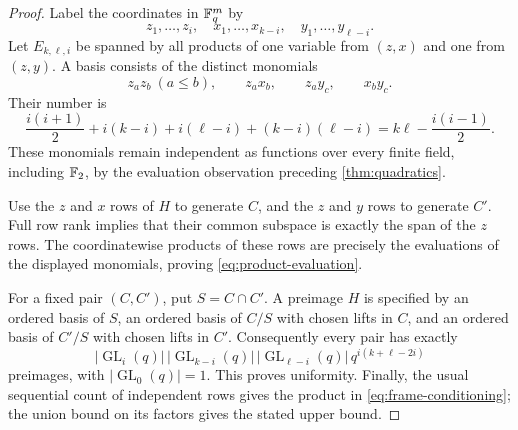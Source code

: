 \begin{proof}
Label the coordinates in $\mathbb F_q^m$ by
\[
 z_1,\ldots,z_i,\quad x_1,\ldots,x_{k-i},\quad
 y_1,\ldots,y_{\ell-i}.
\]
Let $E_{k,\ell,i}$ be spanned by all products of one variable from
$(z,x)$ and one from $(z,y)$.  A basis consists of the distinct monomials
\[
 z_a z_b\ (a\le b),\qquad z_a x_b,\qquad z_a y_c,\qquad x_b y_c.
\]
Their number is
\[
 \frac{i(i+1)}2+i(k-i)+i(\ell-i)+(k-i)(\ell-i)
 =k\ell-\frac{i(i-1)}2.
\]
These monomials remain independent as functions over every finite
field, including $\mathbb F_2$, by the evaluation observation preceding
\cref{thm:quadratics}.

Use the $z$ and $x$ rows of $H$ to generate $C$, and the $z$ and $y$
rows to generate $C'$.  Full row rank implies that their common
subspace is exactly the span of the $z$ rows.  The coordinatewise
products of these rows are precisely the evaluations of the displayed
monomials, proving \eqref{eq:product-evaluation}.

For a fixed pair $(C,C')$, put $S=C\cap C'$.  A preimage $H$ is specified
by an ordered basis of $S$, an ordered basis of $C/S$ with chosen lifts
in $C$, and an ordered basis of $C'/S$ with chosen lifts in $C'$.
Consequently every pair has exactly
\[
 |\operatorname{GL}_i(q)|\,
 |\operatorname{GL}_{k-i}(q)|\,
 |\operatorname{GL}_{\ell-i}(q)|\,
 q^{i(k+\ell-2i)}
\]
preimages, with $|\operatorname{GL}_0(q)|=1$.  This proves uniformity.
Finally, the usual sequential count of independent rows gives the
product in \eqref{eq:frame-conditioning}; the union bound on its factors
gives the stated upper bound.
\end{proof}

